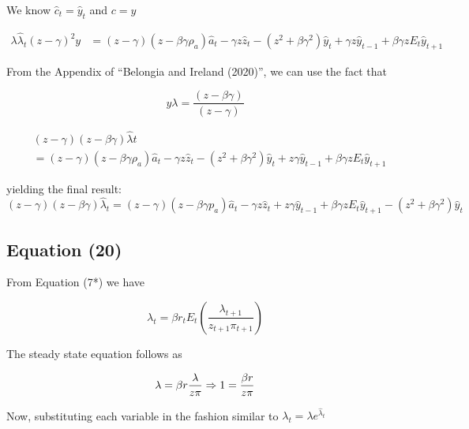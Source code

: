 \documentclass[11pt,preprint, authoryear]{elsarticle}
\numberwithin{equation}{section}
\numberwithin{figure}{section}
\numberwithin{table}{section}
\begin{document}
We know \(\hat{c}_t = \hat{y}_t\) and \(c = y\)

\[\begin{aligned}
\lambda \hat{\lambda}_t (z-\gamma)^{2} y &=
(z-\gamma) (z-\beta \gamma \rho_a ) \hat{a}_t
-\gamma z \hat{z}_t
-\left(z^{2} + \beta \gamma^{2}\right) \hat{y}_{t}
+ \gamma z \hat{y}_{t-1}
+ \beta \gamma z E_{t} \hat{y}_{t+1}
\end{aligned}\]

From the Appendix of ``Belongia and Ireland (2020)'', we can use the
fact that

\[y \lambda=\frac{(z-\beta \gamma)}{(z-\gamma)}\]

\[\begin{aligned} &(z-\gamma)(z-\beta \gamma) \hat{\lambda}{t}\\ 
& = (z-\gamma)\left(z-\beta \gamma \rho_{a}\right) \hat{a}_{t}-\gamma z \hat{z}_{t}-\left(z^{2}+\beta \gamma^{2}\right) \hat{y}_{t}+z \gamma \hat{y}_{t-1} + \beta \gamma z E_{t} \hat{y}_{t+1}
\end{aligned}\]

yielding the final result:
\[(z-\gamma)(z-\beta \gamma) \hat{\lambda}_{t}=(z-\gamma)\left(z-\beta \gamma p_{a}\right) \hat{a}_{t}-\gamma z \hat{z}_{t}+z \gamma \hat{y}_{t-1}+\beta \gamma z E_{t} \hat{y}_{t+1}-\left(z^{2}+\beta \gamma^{2}\right) \hat{y}_{t}\]

\hypertarget{equation-20}{%
\subsection{Equation (20)}\label{equation-20}}

From Equation (7*) we have

\[\lambda_{t}=\beta r_{t} E_{t}\left(\frac{\lambda_{t+1}}{z_{t+1} \pi_{t+1}}\right) \tag{7*}\]

The steady state equation follows as

\[\lambda = \beta r \frac{\lambda} {z \pi} \\
\Rightarrow 1=\frac{\beta r} {z \pi}\]

Now, substituting each variable in the fashion similar to
\(\lambda_t = \lambda e^{\hat{\lambda}_t}\)
\end{document}
